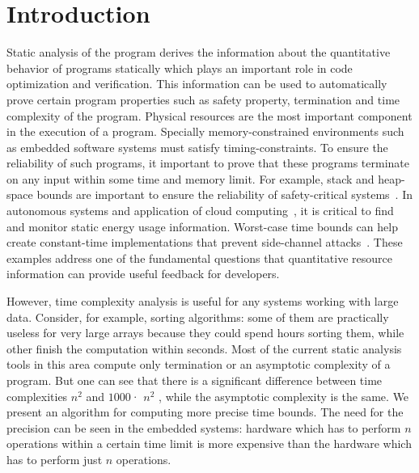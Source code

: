 \section{Introduction}
\label{sec:intro}
Static analysis of the program derives the information about the quantitative behavior of programs statically which plays an important role in code optimization and verification. This information can be used to automatically prove certain program properties such as safety property, termination and time complexity of the program. Physical resources are the most important component in the execution of a program. Specially memory-constrained environments such as embedded software systems must satisfy timing-constraints. To ensure the reliability of such programs, it important to prove that these programs terminate on any input within some time and memory limit. For example, stack and heap-space bounds are important
to ensure the reliability of safety-critical systems~\cite{Regehr:2005:ESO:1113830.1113833}. In autonomous systems and application of cloud computing~\cite{Carroll:2010:APC:1855840.1855861,Cohen:2012:ET:2398857.2384676}, it is critical to find and monitor static energy usage information. Worst-case time bounds
can help create constant-time implementations that prevent side-channel attacks~\cite{Barthe:2014:SNC:2660267.2660283,Kasper:2009:FTR:1617722.1617724}. These examples address one of the fundamental questions that quantitative resource information can provide useful feedback for developers.

However, time complexity analysis is useful for any systems working with large data. Consider, for example, sorting algorithms: some of them are practically useless for very large arrays because they could spend hours sorting them, while other ﬁnish the computation within seconds. Most of the current static analysis tools in this area compute only termination or an asymptotic complexity of a program. But one can see that there is a signiﬁcant difference between time complexities $n^2$ and $1000$· $n^2$ , while the asymptotic complexity is the same. We present an algorithm for computing more precise time bounds. The need for the precision can be seen in the embedded systems: hardware which has to perform $n$ operations within a certain time limit is more expensive than the hardware which has to perform just $n$ operations.

